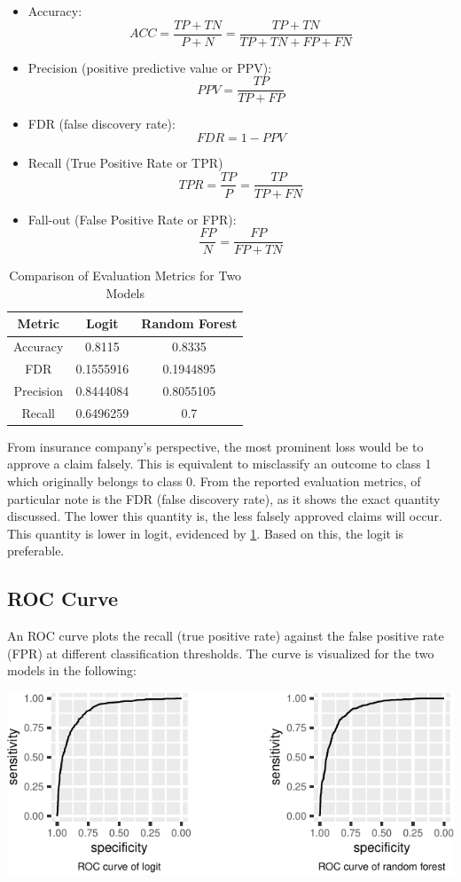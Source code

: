 \documentclass{article}
\providecommand{\tightlist}{%
  \setlength{\itemsep}{0pt}\setlength{\parskip}{0pt}}
\begin{document}
\begin{itemize}
\tightlist
\item
  Accuracy:
  \[ACC = \frac{TP + TN}{P + N} = \frac{TP + TN}{TP + TN + FP + FN}\]
\item
  Precision (positive predictive value or PPV):
  \[PPV = \frac{TP}{TP + FP}\]
\item
  FDR (false discovery rate): \[FDR = 1 - PPV\]
\item
  Recall (True Positive Rate or TPR)
  \[TPR = \frac{TP}{P} = \frac{TP}{TP + FN}\]
\item
  Fall-out (False Positive Rate or FPR):
  \[\frac{FP}{N} = \frac{FP}{FP + TN}\]
\end{itemize}

\begin{table}[h]
\centering
\begin{tabular}{|c|c|c|}
\hline
\textbf{Metric} & \textbf{Logit} & \textbf{Random Forest} \\
\hline
Accuracy & 0.8115 & 0.8335 \\
FDR & 0.1555916 & 0.1944895 \\
Precision & 0.8444084 & 0.8055105 \\
Recall & 0.6496259 & 0.7 \\
\hline
\end{tabular}
\caption{Comparison of Evaluation Metrics for Two Models}
\label{tab:comparison}
\end{table}

From insurance company's perspective, the most prominent loss would be
to approve a claim falsely. This is equivalent to misclassify an outcome
to class 1 which originally belongs to class 0. From the reported
evaluation metrics, of particular note is the FDR (false discovery
rate), as it shows the exact quantity discussed. The lower this quantity
is, the less falsely approved claims will occur. This quantity is lower
in logit, evidenced by \ref{tab:comparison}. Based on this, the logit is
preferable.

\hypertarget{roc-curve}{%
\subsection{ROC Curve}\label{roc-curve}}

An ROC curve plots the recall (true positive rate) against the false
positive rate (FPR) at different classification thresholds. The curve is
visualized for the two models in the following:

\begin{center}\includegraphics{report_files/figure-latex/unnamed-chunk-20-1} \end{center}
\end{document}
